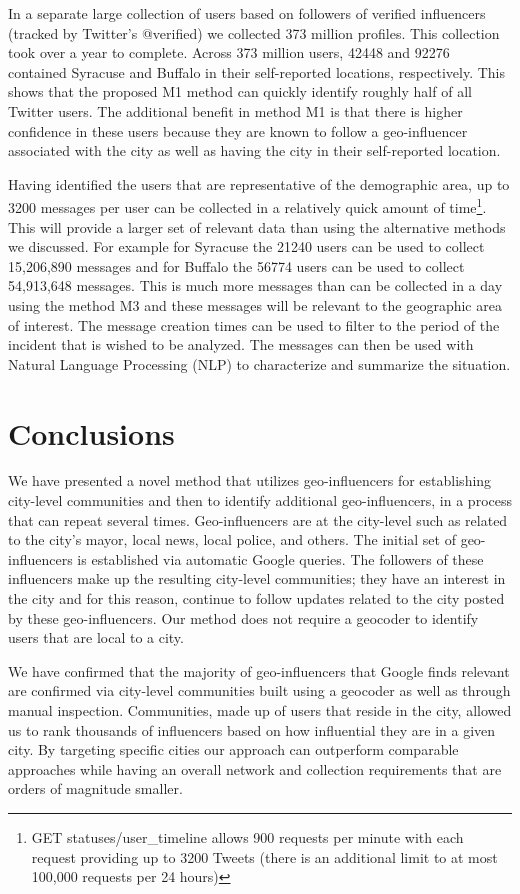 In a separate large collection of users based on followers of verified influencers (tracked by Twitter’s @verified) we collected 373 million profiles. This collection took over a year to complete. Across 373 million users, 42448 and 92276 contained Syracuse and Buffalo in their self-reported locations, respectively. This shows that the proposed M1 method can quickly identify roughly half of all Twitter users. The additional benefit in method M1 is that there is higher confidence in these users because they are known to follow a geo-influencer associated with the city as well as having the city in their self-reported location. 

Having identified the users that are representative of the demographic area, up to 3200 messages per user can be collected in a relatively quick amount of time\footnote{GET statuses/user\_timeline allows 900 requests per minute with each request providing up to 3200 Tweets (there is an additional limit to at most 100,000 requests per 24 hours)}. This will provide a larger set of relevant data than using the alternative methods we discussed. For example for Syracuse the 21240 users can be used to collect 15,206,890 messages and for Buffalo the 56774 users can be used to collect 54,913,648 messages. This is much more messages than can be collected in a day using the method M3 and these messages will be relevant to the geographic area of interest. The message creation times can be used to filter to the period of the incident that is wished to be analyzed. The messages can then be used with Natural Language Processing (NLP) to characterize and summarize the situation.

\section{Conclusions}

We have presented a novel method that utilizes geo-influencers for establishing city-level communities and then to identify additional geo-influencers, in a process that can repeat several times. Geo-influencers are at the city-level such as related to the city's mayor, local news, local police, and others. The initial set of geo-influencers is established via automatic Google queries. The followers of these influencers make up the resulting city-level communities; they have an interest in the city and for this reason, continue to follow updates related to the city posted by these geo-influencers. Our method does not require a geocoder to identify users that are local to a city.

We have confirmed that the majority of geo-influencers that Google finds relevant are confirmed via city-level communities built using a geocoder as well as through manual inspection. Communities, made up of users that reside in the city, allowed us to rank  thousands of influencers based on how influential they are in a given city. By targeting specific cities our approach can outperform comparable approaches while having an overall network and collection requirements that are orders of magnitude smaller. 